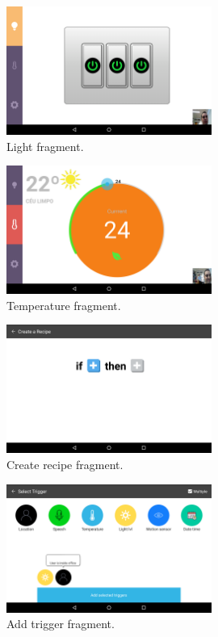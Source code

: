 %


\begin{figure}[H]
\centering
\includegraphics[width=0.6\textwidth]{Figures/screen_lights}
\caption{Light fragment.}
\label{screen_lights}
\end{figure}


\begin{figure}[H]
\centering
\includegraphics[width=0.6\textwidth]{Figures/screen_temperature}
\caption{Temperature fragment.}
\label{screen_temperature}
\end{figure}



\begin{figure}[H]
\centering
\includegraphics[width=0.6\textwidth]{Figures/create_recipe}
\caption{Create recipe fragment.}
\label{create_recipe}
\end{figure}

\begin{figure}[H]
\centering
\includegraphics[width=0.6\textwidth]{Figures/screen_trigger}
\caption{Add trigger fragment.}
\label{screen_triggers}
\end{figure}

